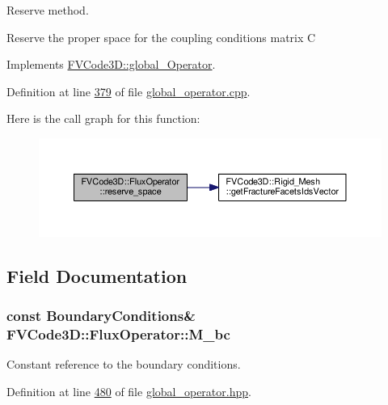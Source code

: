 Reserve method. 

Reserve the proper space for the coupling conditions matrix C 

Implements \hyperlink{classFVCode3D_1_1global__Operator_adeaf69c5dbde01c928a38778f8628d16}{F\+V\+Code3\+D\+::global\+\_\+\+Operator}.



Definition at line \hyperlink{global__operator_8cpp_source_l00379}{379} of file \hyperlink{global__operator_8cpp_source}{global\+\_\+operator.\+cpp}.



Here is the call graph for this function\+:
\nopagebreak
\begin{figure}[H]
\begin{center}
\leavevmode
\includegraphics[width=350pt]{classFVCode3D_1_1FluxOperator_a9fe4f2f355610d1cbb921382253c3853_cgraph}
\end{center}
\end{figure}




\subsection{Field Documentation}
\subsubsection[{\texorpdfstring{M\+\_\+bc}{M_bc}}]{\setlength{\rightskip}{0pt plus 5cm}const {\bf Boundary\+Conditions}\& F\+V\+Code3\+D\+::\+Flux\+Operator\+::\+M\+\_\+bc\hspace{0.3cm}{\ttfamily [private]}}\hypertarget{classFVCode3D_1_1FluxOperator_a4b4dd846c5097f14598d9b75e6c2e306}{}\label{classFVCode3D_1_1FluxOperator_a4b4dd846c5097f14598d9b75e6c2e306}


Constant reference to the boundary conditions. 



Definition at line \hyperlink{global__operator_8hpp_source_l00480}{480} of file \hyperlink{global__operator_8hpp_source}{global\+\_\+operator.\+hpp}.



